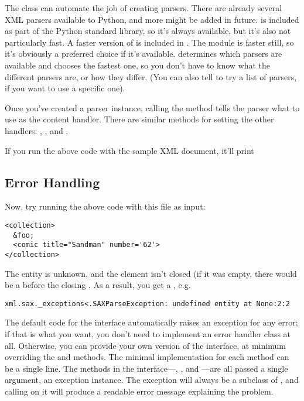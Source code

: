 \documentclass{howto}
\newcommand{\element}[1]{\code{#1}}
\begin{document}
The  class can automate the job of creating
parsers.  There are already several XML parsers available to Python,
and more might be added in future.   is included as
part of the Python standard library, so it's always available, but
it's also not particularly fast.  A faster version of 
is included in .  The 
module is faster still, so it's obviously a preferred choice if it's
available.   determines which parsers are
available and chooses the fastest one, so you don't have to know what
the different parsers are, or how they differ. (You can also tell
 to try a list of parsers, if you want to use a
specific one).

Once you've created a parser instance, calling the
 method tells the parser what to use as
the content handler.  There are similar methods for setting the other
handlers: , , and
.

If you run the above code with the sample XML document, it'll print

\subsection{Error Handling}

Now, try running the above code with this file as input:
\begin{verbatim}
<collection>
  &foo;
  <comic title="Sandman" number='62'>
</collection>
\end{verbatim}

The  entity is unknown, and the \element{comic} element
isn't closed (if it was empty, there would be a \samp{/} before the
closing \samp{>}. As a result, you get a
, e.g.

\begin{verbatim}
xml.sax._exceptions<.SAXParseException: undefined entity at None:2:2
\end{verbatim}

The default code for the  interface automatically
raises an exception for any error; if that is what you want, you don't
need to implement an error handler class at all.  Otherwise, you can
provide your own version of the  interface, at
minimum overriding the  and 
methods.  The minimal implementation for each method can be a single
line.  The methods in the 
interface---, , and
---are all passed a single argument, an exception
instance.  The exception will always be a subclass of
, and calling  on it will produce
a readable error message explaining the problem.
\end{document}
